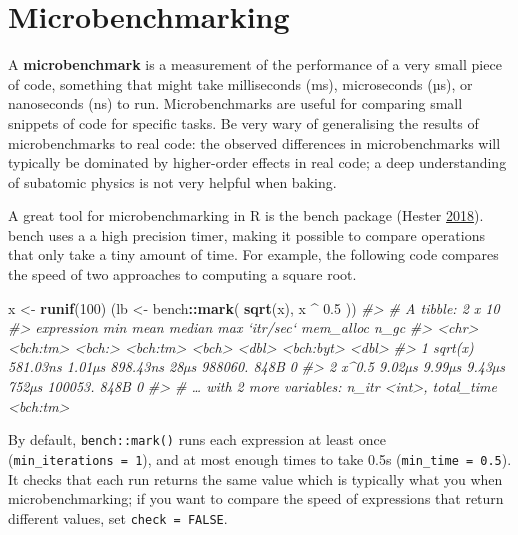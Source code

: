 \documentclass[]{book}
\newenvironment{Shaded}{\begin{snugshade}}{\end{snugshade}}
\newcommand{\CommentTok}[1]{\textcolor[rgb]{0.37,0.37,0.37}{\textit{#1}}}
\newcommand{\DecValTok}[1]{\textcolor[rgb]{0.06,0.06,0.06}{#1}}
\newcommand{\FloatTok}[1]{\textcolor[rgb]{0.06,0.06,0.06}{#1}}
\newcommand{\KeywordTok}[1]{\textcolor[rgb]{0.27,0.27,0.27}{\textbf{#1}}}
\newcommand{\NormalTok}[1]{#1}
\newcommand{\OperatorTok}[1]{\textcolor[rgb]{0.43,0.43,0.43}{\textbf{#1}}}
\newcommand{\StringTok}[1]{\textcolor[rgb]{0.5,0.5,0.5}{#1}}
\begin{document}
\hypertarget{microbenchmarking}{%
\section{Microbenchmarking}\label{microbenchmarking}}


A \textbf{microbenchmark} is a measurement of the performance of a very small piece of code, something that might take milliseconds (ms), microseconds (µs), or nanoseconds (ns) to run. Microbenchmarks are useful for comparing small snippets of code for specific tasks. Be very wary of generalising the results of microbenchmarks to real code: the observed differences in microbenchmarks will typically be dominated by higher-order effects in real code; a deep understanding of subatomic physics is not very helpful when baking.

A great tool for microbenchmarking in R is the bench package (Hester \protect\hyperlink{ref-bench}{2018}). bench uses a a high precision timer, making it possible to compare operations that only take a tiny amount of time. For example, the following code compares the speed of two approaches to computing a square root.

\begin{Shaded}
\begin{Highlighting}[]
\NormalTok{x <-}\StringTok{ }\KeywordTok{runif}\NormalTok{(}\DecValTok{100}\NormalTok{)}
\NormalTok{(lb <-}\StringTok{ }\NormalTok{bench}\OperatorTok{::}\KeywordTok{mark}\NormalTok{(}
  \KeywordTok{sqrt}\NormalTok{(x),}
\NormalTok{  x }\OperatorTok{^}\StringTok{ }\FloatTok{0.5}
\NormalTok{))}
\CommentTok{#> # A tibble: 2 x 10}
\CommentTok{#>   expression      min   mean   median   max `itr/sec` mem_alloc  n_gc}
\CommentTok{#>   <chr>      <bch:tm> <bch:> <bch:tm> <bch>     <dbl> <bch:byt> <dbl>}
\CommentTok{#> 1 sqrt(x)    581.03ns 1.01µs 898.43ns  28µs   988060.      848B     0}
\CommentTok{#> 2 x^0.5        9.02µs 9.99µs   9.43µs 752µs   100053.      848B     0}
\CommentTok{#> # … with 2 more variables: n_itr <int>, total_time <bch:tm>}
\end{Highlighting}
\end{Shaded}

By default, \texttt{bench::mark()} runs each expression at least once (\texttt{min\_iterations\ =\ 1}), and at most enough times to take 0.5s (\texttt{min\_time\ =\ 0.5}). It checks that each run returns the same value which is typically what you when microbenchmarking; if you want to compare the speed of expressions that return different values, set \texttt{check\ =\ FALSE}.
\end{document}
